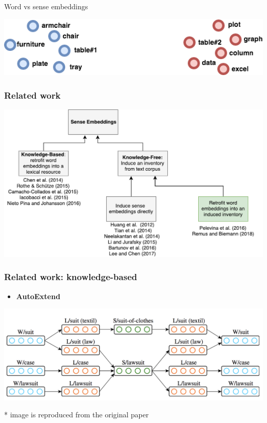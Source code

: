 \documentclass[usenames,dvipsnames]{beamer}
\begin{document}
\begin{frame}{Word vs sense embeddings}

\begin{center}
	\includegraphics[width=1.0\textwidth]{table-unambigous}
\end{center}	
\end{frame}


\begin{frame}[fragile]
\frametitle{Related work}
\begin{center}
 \includegraphics[height=0.56\textwidth]{sense_embeddings}
 \end{center}
\end{frame}


\begin{frame}
\frametitle{Related work: knowledge-based}
\begin{itemize}
	\item \textbf{AutoExtend}~\cite{rothe-schutze:2015:ACL-IJCNLP}
\end{itemize}
\begin{center}
 \includegraphics[width=1.0\textwidth]{autoextend}
 \end{center}

{\footnotesize
 * image is reproduced from the original paper
}

\end{frame}
\end{document}
